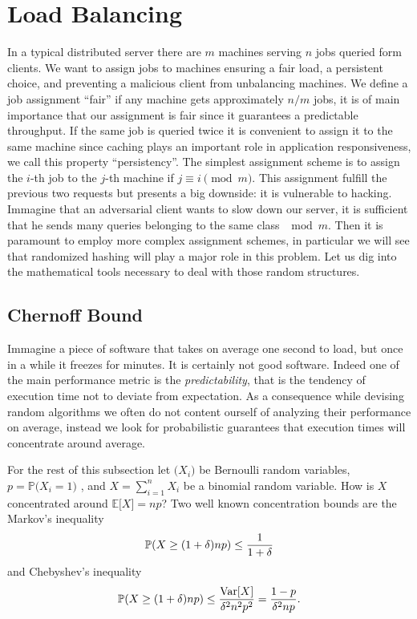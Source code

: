 \section{Load Balancing}

In a typical distributed server there are $m$ machines serving $n$ jobs
queried form clients. We want to assign jobs
to machines ensuring a fair load, a persistent choice, and preventing a
malicious client from unbalancing machines.
We define a job assignment ``fair'' if any machine gets approximately
$n / m$ jobs, it is of main importance that our assignment is fair since
it guarantees a predictable throughput.
If the same job is queried twice it is convenient to assign
it to the same machine since caching plays an important role in application
responsiveness, we call this property ``persistency''.  
The simplest assignment scheme is to assign the $i$-th job to the
$j$-th machine if $j \equiv i \pmod m$. This assignment fulfill the previous
two requests but presents a big downside: it is vulnerable to hacking. Immagine
that an adversarial client wants to slow down our server, it is sufficient
that he sends many queries belonging to the same class $\mod m$. Then it is
paramount to employ more complex assignment schemes, in particular we will see
that randomized hashing will play a major role in this problem. Let us dig into
the mathematical tools necessary to deal with those random structures.

\subsection{Chernoff Bound}
Immagine a piece of
software that takes on average one second to load, but once in a while it
freezes for minutes. It is certainly not good software. Indeed one of the main
performance metric is the \textit{predictability}, that is the tendency
of execution
time not to deviate from expectation. As a consequence while devising
random algorithms we often do not content ourself of analyzing their
performance on average, instead we look for probabilistic guarantees
that execution times will concentrate around average.

For the rest of this subsection let $\bigl(X_i\bigr)$ be Bernoulli random
variables, $p = \mathbb{P}\bigl(X_i = 1\bigr)$ , and $X = \sum_{i=1}^n X_i$ be a binomial
random variable. How is $X$ concentrated around $\mathbb{E}\bigl[X\bigr] = n p$?
Two well known concentration bounds are the Markov's inequality
\begin{equation*}
\operatorname{\mathbb{P}}(X \geq (1 + \delta)np) \leq \frac{1}{1 + \delta}
\end{equation*}
and Chebyshev's inequality
\begin{equation*}
\operatorname{\mathbb{P}}(X \geq (1 + \delta)np) \leq \frac{\mathrm{Var}[X]}{\delta^2 n^2 p^2} = \frac{1 - p}{\delta^2 n p}.
\end{equation*}

